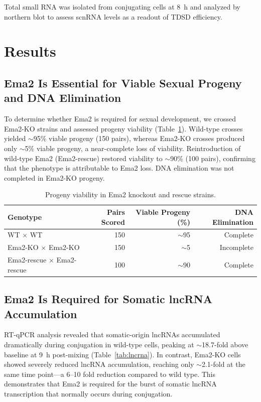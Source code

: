 \documentclass[11pt]{article}
\begin{document}
Total small RNA was isolated from conjugating cells at 8~h and analyzed by northern blot to assess scnRNA levels as a readout of TDSD efficiency.

\section{Results}

\subsection{Ema2 Is Essential for Viable Sexual Progeny and DNA Elimination}

To determine whether Ema2 is required for sexual development, we crossed Ema2-KO strains and assessed progeny viability (Table~\ref{tab:viability}). Wild-type crosses yielded $\sim$95\% viable progeny (150 pairs), whereas Ema2-KO crosses produced only $\sim$5\% viable progeny, a near-complete loss of viability. Reintroduction of wild-type Ema2 (Ema2-rescue) restored viability to $\sim$90\% (100 pairs), confirming that the phenotype is attributable to Ema2 loss. DNA elimination was not completed in Ema2-KO progeny.

\begin{table}[ht]
\centering
\caption{Progeny viability in Ema2 knockout and rescue strains.}
\label{tab:viability}
\begin{tabular}{lrrr}
\toprule
\textbf{Genotype} & \textbf{Pairs Scored} & \textbf{Viable Progeny (\%)} & \textbf{DNA Elimination} \\
\midrule
WT $\times$ WT & 150 & $\sim$95 & Complete \\
Ema2-KO $\times$ Ema2-KO & 150 & $\sim$5 & Incomplete \\
Ema2-rescue $\times$ Ema2-rescue & 100 & $\sim$90 & Complete \\
\bottomrule
\end{tabular}
\end{table}

\subsection{Ema2 Is Required for Somatic lncRNA Accumulation}

RT-qPCR analysis revealed that somatic-origin lncRNAs accumulated dramatically during conjugation in wild-type cells, peaking at $\sim$18.7-fold above baseline at 9~h post-mixing (Table~\ref{tab:lncrna}). In contrast, Ema2-KO cells showed severely reduced lncRNA accumulation, reaching only $\sim$2.1-fold at the same time point---a 6--10 fold reduction compared to wild type. This demonstrates that Ema2 is required for the burst of somatic lncRNA transcription that normally occurs during conjugation.
\end{document}
